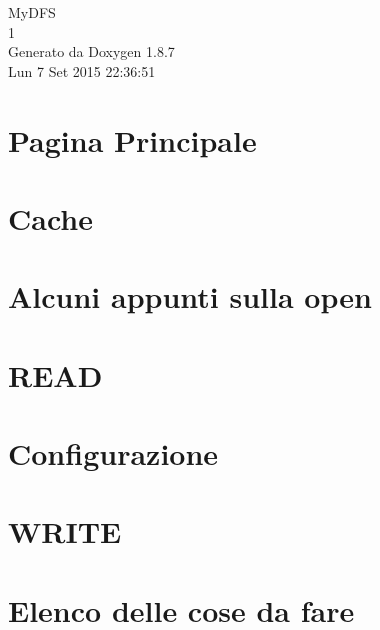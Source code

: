 \documentclass[twoside]{book}
\newcommand{\+}{\discretionary{\mbox{\scriptsize$\hookleftarrow$}}{}{}}
\newcommand{\clearemptydoublepage}{%
  \newpage{\pagestyle{empty}\cleardoublepage}%
}
\begin{document}
\hypersetup{pageanchor=false,
             bookmarks=true,
             bookmarksnumbered=true,
             pdfencoding=unicode
            }
\begin{titlepage}
\vspace*{7cm}
\begin{center}%
{\Large My\+D\+F\+S \\[1ex]\large 1 }\\
\vspace*{1cm}
{\large Generato da Doxygen 1.8.7}\\
\vspace*{0.5cm}
{\small Lun 7 Set 2015 22:36:51}\\
\end{center}
\end{titlepage}
\clearemptydoublepage
\tableofcontents
\clearemptydoublepage
{}
\hypersetup{pageanchor=true}

\chapter{Pagina Principale}
\label{index}\hypertarget{index}{}
\chapter{Cache}
\label{md_Cache}
\hypertarget{md_Cache}{}

\chapter{Alcuni appunti sulla open}
\label{md_OPE}
\hypertarget{md_OPE}{}

\chapter{R\+E\+A\+D}
\label{md_READ}
\hypertarget{md_READ}{}

\chapter{Configurazione}
\label{md_Test}
\hypertarget{md_Test}{}

\chapter{W\+R\+I\+T\+E}
\label{md_WRITE}
\hypertarget{md_WRITE}{}

\chapter{Elenco delle cose da fare}
\label{todo}
\hypertarget{todo}{}

\end{document}
